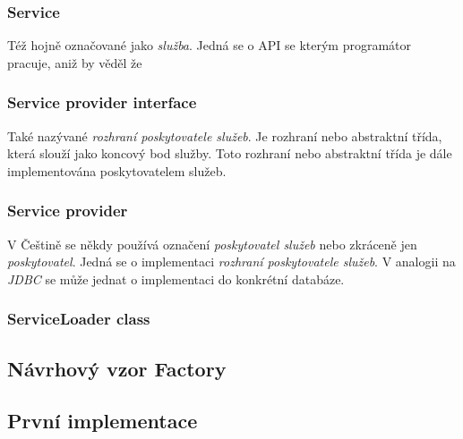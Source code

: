 \subsubsection{Service}
	Též hojně označované jako \textit{služba}. Jedná se o API se kterým programátor pracuje, aniž by věděl že 


\subsubsection{Service provider interface}
	Také nazývané \textit{rozhraní poskytovatele služeb}. Je rozhraní nebo abstraktní třída, která slouží jako koncový bod služby. Toto rozhraní nebo abstraktní třída je dále implementována poskytovatelem služeb.
	
	
\subsubsection{Service provider}
	V Češtině se někdy používá označení \textit{poskytovatel služeb} nebo zkráceně jen \textit{poskytovatel}. Jedná se o implementaci \textit{rozhraní poskytovatele služeb}. V analogii na \textit{JDBC} se může jednat o implementaci do konkrétní databáze.




\subsubsection{ServiceLoader class}




\subsection{Návrhový vzor Factory}



\subsection{První implementace}

	

